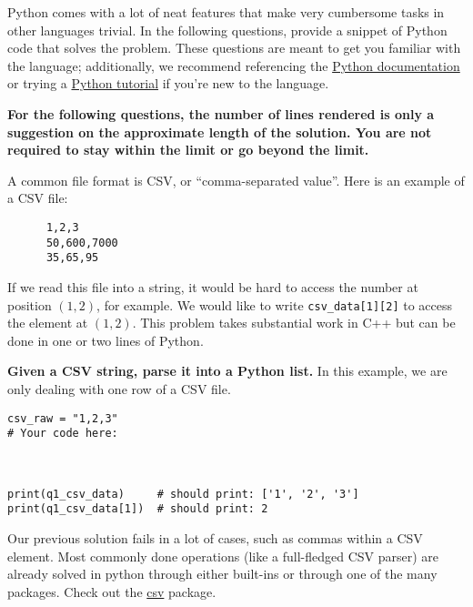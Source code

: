 \documentclass{article}
\begin{document}
Python comes with a lot of neat features that make very cumbersome tasks in other languages trivial. In the following questions, provide a snippet of Python code that solves the problem. These questions are meant to get you familiar with the language; additionally, we recommend referencing the \href{https://docs.python.org/3/}{Python documentation} or trying a \href{http://www.learnpython.org/}{Python tutorial} if you're new to the language. 

\textbf{For the following questions, the number of lines rendered is only a suggestion on the approximate length of the solution. You are not required to stay within the limit or go beyond the limit.}
\begin{enumerate}

\begin{minipage}{\textwidth}
    \item A common file format is CSV, or ``comma-separated value''. Here is an example of a CSV file:
  
    \begin{verbatim}
      1,2,3
      50,600,7000
      35,65,95\end{verbatim}
  
    If we read this file into a string, it would be hard to access the number at position $(1, 2)$, for example. We would like to write \texttt{csv\_data[1][2]} to access the element at $(1, 2)$. This problem takes substantial work in C++ but can be done in one or two lines of Python.
  
    \textbf{Given a CSV string, parse it into a Python list.} In this example, we are only dealing with one row of a CSV file.
    \begin{lstlisting}[style=Python]
csv_raw = "1,2,3"
# Your code here:



print(q1_csv_data)     # should print: ['1', '2', '3']
print(q1_csv_data[1])  # should print: 2
    \end{lstlisting}
\end{minipage}

\begin{minipage}{\textwidth}
    \item Our previous solution fails in a lot of cases, such as commas within a CSV element. Most commonly done operations (like a full-fledged CSV parser) are already solved in python through either built-ins or through one of the many packages. Check out the \href{https://docs.python.org/2/library/csv.html}{csv} package.


\end{minipage}
\end{enumerate}
\end{document}
